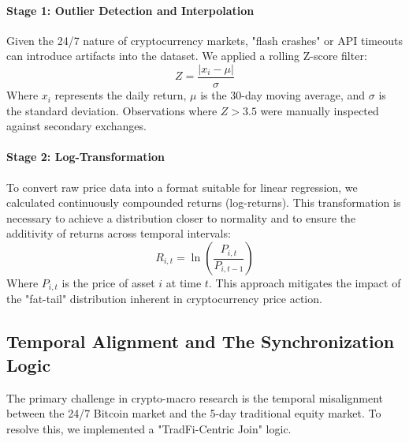 \documentclass[10pt, conference, compsocconf]{IEEEtran}
\begin{document}
\paragraph{Stage 1: Outlier Detection and Interpolation}
Given the 24/7 nature of cryptocurrency markets, "flash crashes" or API timeouts can introduce artifacts into the dataset. We applied a rolling Z-score filter:
$$ Z = \frac{|x_i - \mu|}{\sigma} $$
Where $x_i$ represents the daily return, $\mu$ is the 30-day moving average, and $\sigma$ is the standard deviation. Observations where $Z > 3.5$ were manually inspected against secondary exchanges.

\paragraph{Stage 2: Log-Transformation}
To convert raw price data into a format suitable for linear regression, we calculated continuously compounded returns (log-returns). This transformation is necessary to achieve a distribution closer to normality and to ensure the additivity of returns across temporal intervals:
\begin{equation}
R_{i,t} = \ln \left( \frac{P_{i,t}}{P_{i,t-1}} \right) \label{eq:log_ret}
\end{equation}
Where $P_{i,t}$ is the price of asset $i$ at time $t$. This approach mitigates the impact of the "fat-tail" distribution inherent in cryptocurrency price action.


\subsection{Temporal Alignment and The Synchronization Logic}

The primary challenge in crypto-macro research is the temporal misalignment between the 24/7 Bitcoin market and the 5-day traditional equity market. To resolve this, we implemented a "TradFi-Centric Join" logic.
\end{document}
